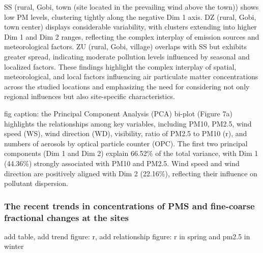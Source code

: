 \documentclass[
  11pt,
]{article}
\begin{document}
SS (rural, Gobi, town (site located in the prevailing wind above the
town)) shows low PM levels, clustering tightly along the negative Dim 1
axis. DZ (rural, Gobi, town center) displays considerable variability,
with clusters extending into higher Dim 1 and Dim 2 ranges, reflecting
the complex interplay of emission sources and meteorological factors. ZU
(rural, Gobi, village) overlaps with SS but exhibits greater spread,
indicating moderate pollution levels influenced by seasonal and
localized factors. These findings highlight the complex interplay of
spatial, meteorological, and local factors influencing air particulate
matter concentrations across the studied locations and emphasizing the
need for considering not only regional influences but also site-specific
characteristics.

fig caption: the Principal Component Analysis (PCA) bi-plot (Figure 7a)
highlights the relationships among key variables, including PM10, PM2.5,
wind speed (WS), wind direction (WD), visibility, ratio of PM2.5 to PM10
(r), and numbers of aerosols by optical particle counter (OPC). The
first two principal components (Dim 1 and Dim 2) explain 66.52\% of the
total variance, with Dim 1 (44.36\%) strongly associated with PM10 and
PM2.5. Wind speed and wind direction are positively aligned with Dim 2
(22.16\%), reflecting their influence on pollutant dispersion.

\subsubsection{The recent trends in concentrations of PMS and
fine-coarse fractional changes at the
sites}\label{the-recent-trends-in-concentrations-of-pms-and-fine-coarse-fractional-changes-at-the-sites}

add table, add trend figure: r, add relationship figure: r in spring and
pm2.5 in winter
\end{document}
